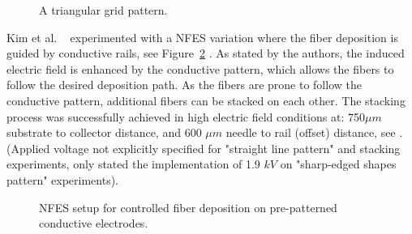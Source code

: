 \documentclass[5p,,preprint,12pt,twocolumn]{elsarticle}
\makeatletter
\def\fixFloatSize#1{}%
\makeatother
\begin{document}
\bgroup
\fixFloatSize{images/6283d5c1-1602-46a7-80a6-96b40d0b22d7-uchang_01.png}
\begin{figure}[!htbp]
\centering \makeatletter{}
\makeatother 
\caption{{A triangular grid pattern. \unskip~\protect\cite{527120:11974306}}}
\label{f-32e7d8abb3aa}
\end{figure}
\egroup
Kim et al. \unskip~\cite{527120:11974313} experimented with a NFES variation where the fiber deposition is guided by conductive rails, see Figure~\ref{f-927e96fb5537} . As stated by the authors, the induced electric field is enhanced by the conductive pattern, which allows the fibers to follow the desired deposition path. As the fibers are prone to follow the conductive pattern, additional fibers can be stacked on each other. The stacking process was successfully achieved in high electric field conditions at: 750$\mu m $ substrate to collector distance, and 600 $\mu m $ needle to rail (offset) distance, see  . (Applied voltage not explicitly specified for "straight line pattern" and stacking experiments, only stated the implementation of 1.9 $kV $ on "sharp-edged shapes pattern" experiments).


\bgroup
\fixFloatSize{images/0fd23deb-7631-4b09-8641-69fc6ac8a6b5-ukim_00.png}
\begin{figure}[!htbp]
\centering \makeatletter{}
\makeatother 
\caption{{NFES setup for controlled fiber deposition on pre-patterned conductive electrodes. \unskip~\protect\cite{527120:11974313}}}
\label{f-927e96fb5537}
\end{figure}
\egroup
\end{document}
